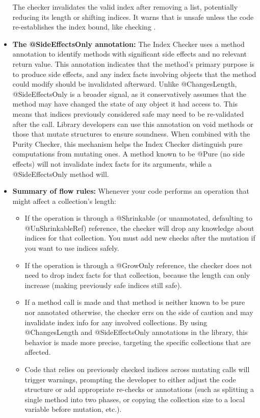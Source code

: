 \begin{itemize}
    The checker invalidates the valid index  after removing a list, potentially reducing its
    length or shifting indices. It warns that  is unsafe unless the code
    re-establishes the index bound, like checking .
\item
  \textbf{The @SideEffectsOnly annotation:}
      The Index Checker uses a method annotation  to identify methods with
      significant side effects and no relevant return value. This annotation indicates that the
      method's primary purpose is to produce side effects, and any index facts involving objects
      that the method could modify should be invalidated afterward. Unlike @ChangesLength,
      @SideEffectsOnly is a broader signal, as it conservatively assumes that the method may
      have changed the state of any object it had access to. This means that indices previously
      considered safe may need to be re-validated after the call. Library developers can use this
      annotation on void methods or those that mutate structures to ensure soundness. When combined
      with the Purity Checker, this mechanism helps the Index Checker distinguish pure computations
      from mutating ones. A method known to be @Pure (no side effects) will not invalidate index facts
      for its arguments, while a @SideEffectsOnly method will.
\item
  \textbf{Summary of flow rules:}
    Whenever your code performs an operation that might affect a collection’s length:
    \begin{itemize}
    \item
      If the operation is through a @Shrinkable (or unannotated, defaulting to @UnShrinkableRef) reference,
      the checker will drop any knowledge about indices for that collection. You must add new checks
      after the mutation if you want to use indices safely.
    \item
      If the operation is through a @GrowOnly reference, the checker does not need to drop index facts for that collection,
      because the length can only increase (making previously safe indices still safe).
    \item
      If a method call is made and that method is neither known to be pure nor annotated otherwise, the checker errs on the
      side of caution and may invalidate index info for any involved collections. By using @ChangesLength and @SideEffectsOnly
      annotations in the library, this behavior is made more precise, targeting the specific collections that are affected.
    \item
      Code that relies on previously checked indices across mutating calls will trigger warnings, prompting the developer
      to either adjust the code structure or add appropriate re-checks or annotations (such as splitting a single method
      into two phases, or copying the collection size to a local variable before mutation, etc.).
    \end{itemize}
\end{itemize}


